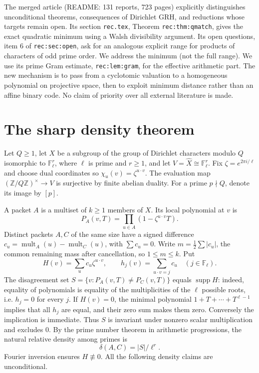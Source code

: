 \documentclass[11pt]{article}
\theoremstyle{remark}\newtheorem{remark}[theorem]{Remark}
\newcommand{\F}{\mathbb F}
\newcommand{\Z}{\mathbb Z}
\newcommand{\supp}{\operatorname{supp}}
\begin{document}
The merged article \cite{article} (README: 131 reports, 723 pages) explicitly distinguishes unconditional theorems, consequences of Dirichlet GRH, and reductions whose targets remain open. Its section \texttt{rec.tex}, Theorem \texttt{rec:thm:qmatch}, gives the exact quadratic minimum using a Walsh divisibility argument. Its open questions, item 6 of \texttt{rec:sec:open}, ask for an analogous explicit range for products of characters of odd prime order. We address the minimum (not the full range). We use its prime Gram estimate, \texttt{rec:lem:gram}, for the effective arithmetic part. The new mechanism is to pass from a cyclotomic valuation to a homogeneous polynomial on projective space, then to exploit minimum distance rather than an affine binary code. No claim of priority over all external literature is made.

\section{The sharp density theorem}
Let $Q\ge1$, let $X$ be a subgroup of the group of Dirichlet characters modulo $Q$ isomorphic to $\F_\ell^r$, where $\ell$ is prime and $r\ge1$, and let $V=\widehat X\cong\F_\ell^r$. Fix $\zeta=e^{2\pi i/\ell}$ and choose dual coordinates so $\chi_u(v)=\zeta^{u\cdot v}$. The evaluation map $(\Z/Q\Z)^\times\to V$ is surjective by finite abelian duality. For a prime $p\nmid Q$, denote its image by $[p]$.

A packet $A$ is a multiset of $k\ge1$ members of $X$. Its local polynomial at $v$ is
\[
P_A(v,T)=\prod_{u\in A}(1-\zeta^{u\cdot v}T).
\]
Distinct packets $A,C$ of the same size have a signed difference $c_u=\operatorname{mult}_A(u)-\operatorname{mult}_C(u)$, with $\sum c_u=0$. Write $m=\frac12\sum|c_u|$, the common remaining mass after cancellation, so $1\le m\le k$. Put
\[
H(v)=\sum_u c_u\zeta^{u\cdot v},\qquad h_j(v)=\sum_{u\cdot v=j}c_u\quad (j\in\F_\ell).
\]
The disagreement set $S=\{v:P_A(v,T)\ne P_C(v,T)\}$ equals $\supp H$: indeed, equality of polynomials is equality of the multiplicities of the $\ell$ possible roots, i.e. $h_j=0$ for every $j$. If $H(v)=0$, the minimal polynomial $1+T+\cdots+T^{\ell-1}$ implies that all $h_j$ are equal, and their zero sum makes them zero. Conversely the implication is immediate. Thus $S$ is invariant under nonzero scalar multiplication and excludes $0$. By the prime number theorem in arithmetic progressions, the natural relative density among primes is
\begin{equation}\label{eq:density}
\delta(A,C)=|S|/\ell^r.
\end{equation}
Fourier inversion ensures $H\not\equiv0$. All the following density claims are unconditional.
\end{document}
